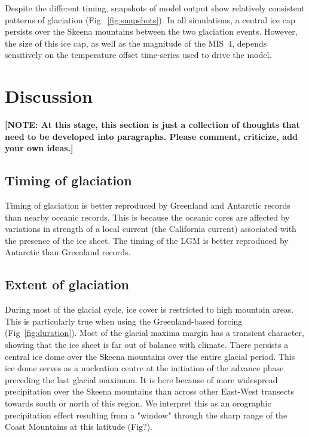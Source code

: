 \documentclass[tc, ms]{copernicus}
\newcommand{\note}[1]{\textbf{[NOTE: #1]}}
\begin{document}
Despite the different timing,
snapshots of model output show relatively consistent patterns of glaciation
(Fig.~\ref{fig:snapshots}). In all simulations, a central ice cap persists over
the Skeena mountains between the two glaciation events. However, the size of
this ice cap, as well as the magnitude of the MIS~4, depends sensitively on the temperature
offset time-series used to drive the model.

\section{Discussion}
\label{sec:discussion}

\note{At this stage, this section is just a collection of thoughts that need to
be developed into paragraphs. Please comment, criticize, add your own ideas.}

\subsection{Timing of glaciation}

Timing of glaciation is better reproduced by Greenland and Antarctic records than
nearby oceanic records. This is because the oceanic cores are affected by
variations in strength of a local current (the California current) associated
with the presence of the ice sheet. The timing of the LGM is better reproduced
by Antarctic than Greenland records.

\subsection{Extent of glaciation}

During most of the glacial cycle, ice cover is restricted to high mountain
areas. This is particularly true when using the Greenland-based forcing
(Fig~\ref{fig:duration}). Most of the glacial maxima margin has a transient
character, showing that the ice sheet is far out of balance with climate. There
persists a central ice dome over the Skeena mountains over the entire glacial
period. This ice dome serves as a nucleation centre at the initiation of the
advance phase preceding the last glacial maximum. It is here because of more
widespread precipitation over the Skeena mountains than across other East-West
transects towards south or north of this region. We interpret this as an
orographic precipitation effect resulting from a "window" through the sharp
range of the Coast Mountains at this latitude (Fig?).
\end{document}
